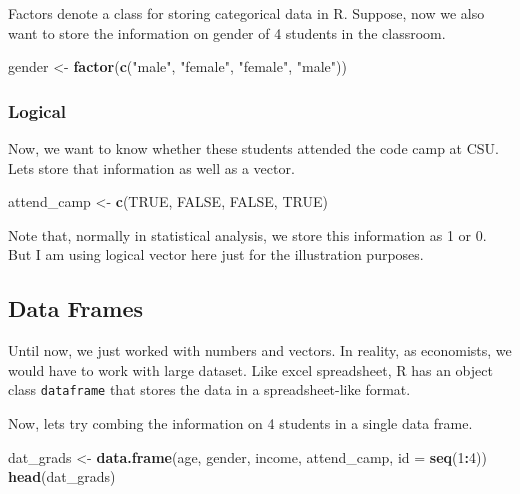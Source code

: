 \documentclass[
]{article}
\newenvironment{Shaded}{\begin{snugshade}}{\end{snugshade}}
\newcommand{\AttributeTok}[1]{\textcolor[rgb]{0.13,0.29,0.53}{#1}}
\newcommand{\ConstantTok}[1]{\textcolor[rgb]{0.56,0.35,0.01}{#1}}
\newcommand{\DecValTok}[1]{\textcolor[rgb]{0.00,0.00,0.81}{#1}}
\newcommand{\FunctionTok}[1]{\textcolor[rgb]{0.13,0.29,0.53}{\textbf{#1}}}
\newcommand{\NormalTok}[1]{#1}
\newcommand{\OtherTok}[1]{\textcolor[rgb]{0.56,0.35,0.01}{#1}}
\newcommand{\SpecialCharTok}[1]{\textcolor[rgb]{0.81,0.36,0.00}{\textbf{#1}}}
\newcommand{\StringTok}[1]{\textcolor[rgb]{0.31,0.60,0.02}{#1}}
\begin{document}
Factors denote a class for storing categorical data in R. Suppose, now
we also want to store the information on gender of 4 students in the
classroom.

\begin{Shaded}
\begin{Highlighting}[]
\NormalTok{gender }\OtherTok{\textless{}{-}} \FunctionTok{factor}\NormalTok{(}\FunctionTok{c}\NormalTok{(}\StringTok{"male"}\NormalTok{, }\StringTok{"female"}\NormalTok{, }\StringTok{"female"}\NormalTok{, }\StringTok{"male"}\NormalTok{))}
\end{Highlighting}
\end{Shaded}

\subsubsection{Logical}\label{logical}

Now, we want to know whether these students attended the code camp at
CSU. Lets store that information as well as a vector.

\begin{Shaded}
\begin{Highlighting}[]
\NormalTok{attend\_camp }\OtherTok{\textless{}{-}} \FunctionTok{c}\NormalTok{(}\ConstantTok{TRUE}\NormalTok{, }\ConstantTok{FALSE}\NormalTok{, }\ConstantTok{FALSE}\NormalTok{, }\ConstantTok{TRUE}\NormalTok{)}
\end{Highlighting}
\end{Shaded}

Note that, normally in statistical analysis, we store this information
as 1 or 0. But I am using logical vector here just for the illustration
purposes.

\subsection{Data Frames}\label{data-frames}

Until now, we just worked with numbers and vectors. In reality, as
economists, we would have to work with large dataset. Like excel
spreadsheet, R has an object class \texttt{dataframe} that stores the
data in a spreadsheet-like format.

Now, lets try combing the information on 4 students in a single data
frame.

\begin{Shaded}
\begin{Highlighting}[]
\NormalTok{dat\_grads }\OtherTok{\textless{}{-}} \FunctionTok{data.frame}\NormalTok{(age, gender, income, attend\_camp, }\AttributeTok{id =} \FunctionTok{seq}\NormalTok{(}\DecValTok{1}\SpecialCharTok{:}\DecValTok{4}\NormalTok{))}
\FunctionTok{head}\NormalTok{(dat\_grads)}
\end{Highlighting}
\end{Shaded}
\end{document}
